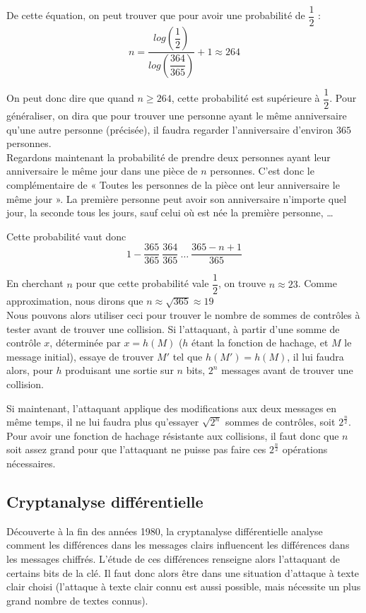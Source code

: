 De cette équation, on peut trouver que pour avoir une probabilité
de $\dfrac{1}{2}$ : 
\[ n =
\dfrac{log\left(\dfrac{1}{2}\right)}{log\left(\dfrac{364}{365}\right)}
+ 1 \approx 264 \]

On peut donc dire que quand $n \geq 264$, cette probabilité est
supérieure à $\dfrac{1}{2}$. Pour généraliser, on dira que pour
trouver une personne ayant le même anniversaire qu'une autre
personne (précisée), il faudra regarder l'anniversaire d'environ
$365$ personnes.
\\

Regardons maintenant la probabilité de prendre deux personnes
ayant leur anniversaire le même jour dans une pièce de $n$
personnes. C'est donc le complémentaire de « Toutes les personnes
de la pièce ont leur anniversaire le même jour ».
La première personne peut avoir son anniversaire n'importe quel
jour, la seconde tous les jours, sauf celui où est née la première
personne, …

Cette probabilité vaut donc
\[1 - \dfrac{365}{365} ~ \dfrac{364}{365} ~ \dots ~ \dfrac{365 - n
+ 1}{365} \]

En cherchant $n$ pour que cette probabilité vale 
$\dfrac{1}{2}$, on trouve $n \approx 23$. Comme approximation, nous
dirons que $n \approx \sqrt{365} \approx 19$
\\

Nous pouvons alors utiliser ceci pour trouver le nombre
de sommes de contrôles à tester avant de trouver une collision.
Si l'attaquant, à partir d'une somme de contrôle $x$,
déterminée par $x = h(M)$ ($h$ étant la fonction de hachage, et
$M$ le message initial), essaye de trouver $M'$ tel que $h(M') =
h(M)$, il lui faudra alors, pour $h$ produisant une sortie sur $n$
bits, $2^n$ messages avant de trouver une collision.

Si maintenant, l'attaquant applique des modifications aux deux
messages en même temps, il ne lui faudra plus qu'essayer
$\sqrt{2^n}$ sommes de contrôles, soit $2^{\frac{n}{2}}$.
Pour avoir une fonction de hachage résistante aux collisions, il
faut donc que $n$ soit assez grand pour que l'attaquant ne puisse
pas faire ces $2^{\frac{n}{2}}$ opérations nécessaires.

\subsection{Cryptanalyse différentielle}
Découverte à la fin des années 1980, la cryptanalyse
différentielle analyse comment les différences dans les messages
clairs influencent les différences dans les messages chiffrés.
L'étude de ces différences renseigne alors l'attaquant de certains
bits de la clé. Il
faut donc alors être dans une situation d'attaque à texte clair
choisi (l'attaque à texte clair connu est aussi possible, mais
nécessite un plus grand nombre de textes connus). 

